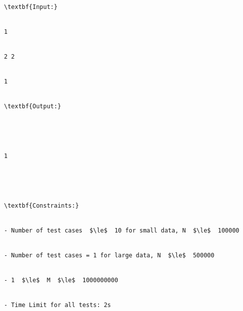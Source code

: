 \begin{verbatim}
\textbf{Input:}


1


2 2


1


\textbf{Output:}





1





\textbf{Constraints:}


- Number of test cases  $\le$  10 for small data, N  $\le$  100000


- Number of test cases = 1 for large data, N  $\le$  500000


- 1  $\le$  M  $\le$  1000000000


- Time Limit for all tests: 2s\end{verbatim}